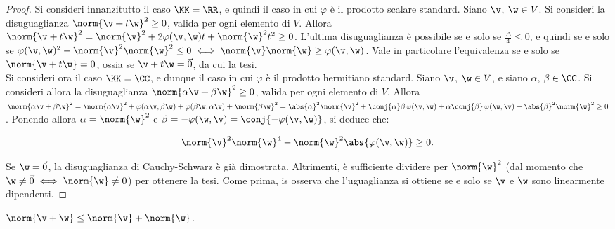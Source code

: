\begin{proof}
	Si consideri innanzitutto il caso $\KK = \RR$, e quindi il caso in cui $\varphi$ è
	il prodotto scalare standard. Siano $\v$, $\w \in V$.
	Si consideri la disuguaglianza $\norm{\v + t\w}^2 \geq 0$, valida
	per ogni elemento di $V$. Allora $\norm{\v + t \w}^2 = \norm{\v}^2 + 2 \varphi(\v, \w) t + \norm{\w}^2 t^2 \geq 0$. L'ultima disuguaglianza è possibile se e solo se $\frac{\Delta}{4} \leq 0$, e quindi se e solo
	se $\varphi(\v, \w)^2 - \norm{\v}^2 \norm{\w}^2 \leq 0 \iff \norm{\v} \norm{\w} \geq \varphi(\v, \w)$.
	Vale in particolare l'equivalenza se e solo se $\norm{\v + t\w} = 0$, ossia se $\v + t\w = \vec 0$, da cui
	la tesi. \\
	
	Si consideri ora il caso $\KK = \CC$, e dunque il caso in cui $\varphi$ è il prodotto hermitiano
	standard. Siano $\v$, $\w \in V$, e siano $\alpha$, $\beta \in \CC$. Si consideri allora
	la disuguaglianza $\norm{\alpha \v + \beta \w}^2 \geq 0$, valida per ogni elemento di $V$. Allora
	$\norm{\alpha \v + \beta \w}^2 = \norm{\alpha \v}^2 + \varphi(\alpha \v, \beta \w) + \varphi(\beta \w, \alpha \v) + \norm{\beta \w}^2 = \abs{\alpha}^2 \norm{\v}^2 + \conj{\alpha} \beta \, \varphi(\v, \w) +
	\alpha \conj{\beta} \, \varphi(\w, \v) + \abs{\beta}^2 \norm{\w}^2 \geq 0$. Ponendo allora
	$\alpha = \norm{\w}^2$ e $\beta = -\varphi(\w, \v) = \conj{-\varphi(\v, \w)}$, si deduce che:
	
	\[ \norm{\v}^2 \norm{\w}^4 - \norm{\w}^2 \abs{\varphi(\v, \w)} \geq 0. \]
	
	\vskip 0.05in
	
	Se $\w = \vec 0$, la disuguaglianza di Cauchy-Schwarz è già dimostrata. Altrimenti, è sufficiente
	dividere per $\norm{\w}^2$ (dal momento che $\w \neq \vec 0 \iff \norm{\w} \neq 0$) per ottenere
	la tesi. Come prima, is osserva che l'uguaglianza si ottiene se e solo se $\v$ e $\w$ sono
	linearmente dipendenti.
\end{proof}

\begin{proposition} 
	$\norm{\v + \w} \leq \norm{\v} + \norm{\w}$.
\end{proposition}

